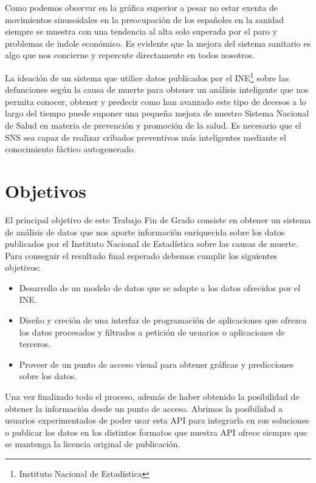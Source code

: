 Como podemos observar en la gráfica superior a pesar no estar exenta de movimientos sinusoidales 
en la preocupación de los españoles en la sanidad siempre se muestra con una tendencia al alta 
solo superada por el paro y problemas de índole económico. 
Es evidente que la mejora del sistema sanitario es algo que nos concierne y repercute 
directamente en todos nosotros.

La ideación de un sistema que utilice datos publicados por el INE\footnote{Instituto Nacional de Estadística} sobre las defunciones según 
la causa de muerte para obtener un análisis inteligente que nos permita conocer, obtener y predecir
como han avanzado este tipo de decesos a lo largo del tiempo puede suponer una pequeña mejora de 
nuestro Sistema Nacional de Salud en materia de prevención y promoción de la salud. Es necesario que el 
SNS sea capaz de realizar cribados preventivos más inteligentes mediante el conocimiento fáctico autogenerado.

\section{Objetivos}
El principal objetivo de este Trabajo Fin de Grado consiste en obtener un sistema de análisis de datos que nos aporte
información enriquecida sobre los datos publicados por el Instituto Nacional de Estadística sobre las causas de muerte. 
Para conseguir el resultado final esperado debemos cumplir los siguientes objetivos:
\begin{itemize}
    \item Desarrollo de un modelo de datos que se adapte a los datos ofrecidos por el INE.
    \item Diseño y creción de una interfaz de programación de aplicaciones que ofrezca los datos procesados y 
filtrados a petición de usuarios o aplicaciones de terceros.
    \item Proveer de un punto de acceso visual para obtener gráficas y predicciones sobre los datos.
\end{itemize}

Una vez finalizado todo el proceso, además de haber obtenido la posibilidad de obtener la información 
desde un punto de acceso. Abrimos la posibilidad a usuarios experimentados de poder usar esta API para 
integrarla en sus soluciones o publicar los datos en los distintos formatos que nuestra API ofrece 
siempre que se mantenga la licencia original de publicación.

